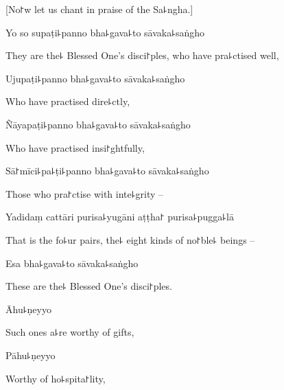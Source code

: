 \begin{leader}
\end{leader}

\begin{english}
  [No꜓w let us chant in praise of the Sa꜕ngha.]
\end{english}

Yo so supaṭi꜕panno bha꜕gava꜕to sāvaka꜕saṅgho

\begin{english}
  They are the꜕ Blessed One's disci꜓ples, who have pra꜕ctised well,
\end{english}

Ujupaṭi꜕panno bha꜕gava꜕to sāvaka꜕saṅgho

\begin{english}
  Who have practised dire꜕ctly,
\end{english}

Ñāyapaṭi꜕panno bha꜕gava꜕to sāvaka꜕saṅgho

\begin{english}
  Who have practised insi꜓ghtfully,
\end{english}

Sā꜓mīci꜕pa꜕ṭi꜕panno bha꜕gava꜕to sāvaka꜕saṅgho

\begin{english}
  Those who pra꜓ctise with inte꜕grity --
\end{english}

Yadidaṃ cattāri purisa꜕yugāni aṭṭha꜓ purisa꜕pugga꜕lā

\begin{english}
  That is the fo꜕ur pairs, the꜕ eight kinds of no꜓ble꜕ beings --
\end{english}

Esa bha꜕gava꜕to sāvaka꜕saṅgho

\begin{english}
  These are the꜕ Blessed One's disci꜓ples.
\end{english}

Āhu꜕ṇeyyo

\begin{english}
  Such ones a꜕re worthy of gifts,
\end{english}

Pāhu꜕ṇeyyo

\begin{english}
  Worthy of ho꜕spita꜓lity,
\end{english}

\enlargethispage{\baselineskip}

